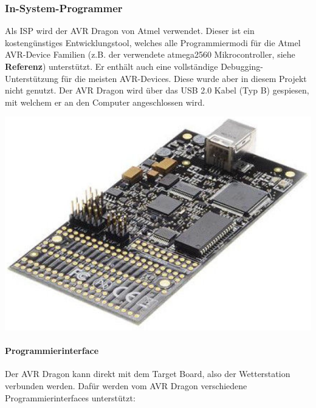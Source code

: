 \subsubsection{In-System-Programmer}
\label{subsubsec:insystemprogrammer}

\begin{minipage}[b][6.5cm][t]{0.5\textwidth}
Als ISP wird der AVR Dragon von Atmel verwendet. Dieser ist ein kostengünstiges Entwicklungstool, welches alle Programmiermodi für die Atmel AVR-Device Familien (z.B. der verwendete atmega2560 Mikrocontroller, siehe \textbf{Referenz}) unterstützt. Er enthält auch eine vollständige Debugging-Unterstützung für die meisten AVR-Devices. Diese wurde aber in diesem Projekt nicht genutzt. Der AVR Dragon wird über das USB 2.0 Kabel (Typ B) gespiesen, mit welchem er an den Computer angeschlossen wird. \cite{avrdragonug}\\

\end{minipage}
\begin{minipage}[b][6.5cm][t]{0.48\textwidth}
\centering
\includegraphics[width=\textwidth]{graphics/ISP/avr_dragon.PNG}
\end{minipage}

\paragraph{Programmierinterface}
\label{para:programmierinterface}

Der AVR Dragon kann direkt mit dem Target Board, also der Wetterstation verbunden werden. Dafür werden vom AVR Dragon verschiedene Programmierinterfaces unterstützt: \cite{avrdragonug}\\

